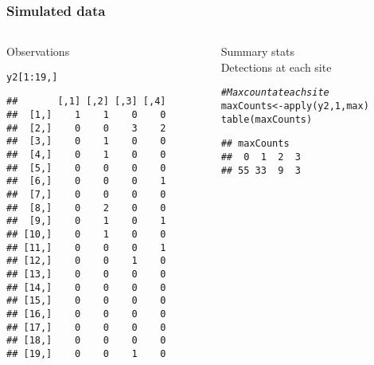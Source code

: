 \documentclass[color=usenames,dvipsnames]{beamer}\usepackage[]{graphicx}\usepackage[]{xcolor}
\makeatletter
\newcommand{\hlnum}[1]{\textcolor[rgb]{0.69,0.494,0}{#1}}%
\newcommand{\hlcom}[1]{\textcolor[rgb]{0.514,0.506,0.514}{\textit{#1}}}%
\newcommand{\hlopt}[1]{\textcolor[rgb]{0,0,0}{#1}}%
\newcommand{\hlstd}[1]{\textcolor[rgb]{0,0,0}{#1}}%
\newcommand{\hlkwb}[1]{\textcolor[rgb]{0,0.341,0.682}{#1}}%
\newcommand{\hlkwd}[1]{\textcolor[rgb]{0.004,0.004,0.506}{#1}}%
\newenvironment{kframe}{%
 \def\at@end@of@kframe{}%
 \ifinner\ifhmode%
  \def\at@end@of@kframe{\end{minipage}}%
  \begin{minipage}{\columnwidth}%
 \fi\fi%
 \def\FrameCommand##1{\hskip\@totalleftmargin \hskip-\fboxsep
 \colorbox{shadecolor}{##1}\hskip-\fboxsep
     \hskip-\linewidth \hskip-\@totalleftmargin \hskip\columnwidth}%
 \MakeFramed {\advance\hsize-\width
   \@totalleftmargin\z@ \linewidth\hsize
   \@setminipage}}%
 {\par\unskip\endMakeFramed%
 \at@end@of@kframe}
\newenvironment{knitrout}{}{} %
\makeatother
\begin{document}
\begin{frame}[fragile]
  \frametitle{Simulated data}
  \begin{columns}
    \begin{column}{0.4\textwidth}
      \small
      Observations
\begin{knitrout}\scriptsize
{}\color{fgcolor}\begin{kframe}
\begin{alltt}
\hlstd{y2[}\hlnum{1}\hlopt{:}\hlnum{19}\hlstd{,]}
\end{alltt}
\begin{verbatim}
##       [,1] [,2] [,3] [,4]
##  [1,]    1    1    0    0
##  [2,]    0    0    3    2
##  [3,]    0    1    0    0
##  [4,]    0    1    0    0
##  [5,]    0    0    0    0
##  [6,]    0    0    0    1
##  [7,]    0    0    0    0
##  [8,]    0    2    0    0
##  [9,]    0    1    0    1
## [10,]    0    1    0    0
## [11,]    0    0    0    1
## [12,]    0    0    1    0
## [13,]    0    0    0    0
## [14,]    0    0    0    0
## [15,]    0    0    0    0
## [16,]    0    0    0    0
## [17,]    0    0    0    0
## [18,]    0    0    0    0
## [19,]    0    0    1    0
\end{verbatim}
\end{kframe}
\end{knitrout}
  \end{column}
  \begin{column}{0.6\textwidth}
    \pause
    {\centering Summary stats \\}
    \vspace{24pt}
  Detections at each site \\
\begin{knitrout}\scriptsize
{}\color{fgcolor}\begin{kframe}
\begin{alltt}
\hlcom{# Max count at each site}
\hlstd{maxCounts} \hlkwb{<-} \hlkwd{apply}\hlstd{(y2,} \hlnum{1}\hlstd{, max)}
\hlkwd{table}\hlstd{(maxCounts)}
\end{alltt}
\begin{verbatim}
## maxCounts
##  0  1  2  3 
## 55 33  9  3
\end{verbatim}
\end{kframe}
\end{knitrout}
\pause

\end{column}
\end{columns}
\end{frame}
\end{document}
